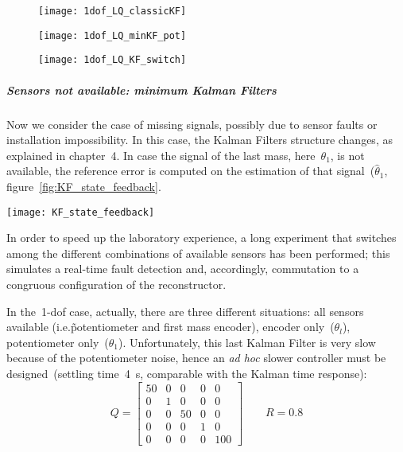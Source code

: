 \begin{figure*}
	\centering
	\begin{subfigure}{0.45\columnwidth}
		\texttt{[image: 1dof\_LQ\_classicKF]}
		\label{fig:1dof_LQ_classicKF}
	\end{subfigure}
	\begin{subfigure}{0.45\columnwidth}
		\texttt{[image: 1dof\_LQ\_minKF\_pot]}
		\label{fig:1dof_LQ_minKF_pot}
	\end{subfigure}
	\newline
	\begin{subfigure}{\columnwidth}
		\centering
		\texttt{[image: 1dof\_LQ\_KF\_switch]}
		\label{fig:1dof_LQ_KF_switch}
	\end{subfigure}
	\caption{LQG with different sensors available, \acrshort{1-dof} case}
\end{figure*}

\subparagraph{Sensors not available: minimum Kalman Filters}

Now we consider the case of missing signals, possibly due to sensor faults or installation impossibility. In this case, the Kalman Filters structure changes, as explained in chapter~4. In case the signal of the last mass, here~$\theta_1$, is not available, the reference error is computed on the estimation of that signal~($\hat\theta_1$, figure~\ref{fig:KF_state_feedback}. \\

\begin{figure*}
	\centering
	\texttt{[image: KF\_state\_feedback]}
	\caption{State measurement not available: estimated state feedback, \acrshort{1-dof} case}
	\label{fig:KF_state_feedback}
\end{figure*}

In order to speed up the laboratory experience, a long experiment that switches among the different combinations of available sensors has been performed; this simulates a real-time fault detection and, accordingly, commutation to a congruous configuration of the reconstructor.

In the~\acrshort{1-dof} case, actually, there are three different situations: all sensors available (i.e.\~potentiometer and first mass encoder), encoder only~($\theta_l$), potentiometer only~($\theta_1$). Unfortunately, this last Kalman Filter is very slow because of the potentiometer noise, hence an \textit{ad hoc} slower controller must be designed~(settling time~4~s, comparable with the Kalman time response):
\begin{equation}
	Q =
	\begin{bmatrix}
		50 & 0 & 0 & 0 & 0 \\
		0 & 1 & 0 & 0 & 0 \\
		0 & 0 & 50 & 0 & 0 \\
		0 & 0 & 0 & 1 & 0 \\
		0 & 0 & 0 & 0 & 100
	\end{bmatrix}
	\qquad
	R = 0.8
\end{equation}

